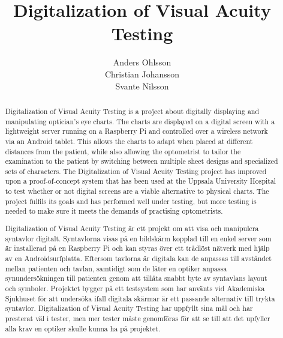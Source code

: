 \documentclass[12pt,a4paper,notitlepage]{report}
\begin{document}

\title{Digitalization of Visual Acuity Testing}
\author{Anders Ohlsson\\Christian Johansson\\Svante Nilsson}
\maketitle

\begin{abstract}
Digitalization of Visual Acuity Testing is a project about digitally displaying and manipulating optician's eye charts. The charts are displayed on a digital screen with a lightweight server running on a Raspberry Pi and controlled over a wireless network via an Android tablet. 
This allows the charts to adapt when placed at different distances from the patient, while also allowing the optometrist to tailor the examination to the patient by switching between multiple sheet designs and specialized sets of characters. 
The Digitalization of Visual Acuity Testing project has improved upon a proof-of-concept system that has been used at the Uppsala University Hospital to test whether or not digital screens are a viable alternative to physical charts. The project fulfils its goals and has performed well under testing, but more testing is needed to make sure it meets the demands of practising optometrists.
\end{abstract}
\renewcommand{\abstractname}{Sammanfattning}
\begin{abstract}
Digitalization of Visual Acuity Testing är ett projekt om att visa och manipulera syntavlor digitalt. Syntavlorna visas på en bildskärm kopplad till en enkel server som är installerad på en Raspberry Pi och kan styras över ett trådlöst nätverk med hjälp av en Androidsurfplatta. Eftersom tavlorna är digitala kan de anpassas till avståndet mellan patienten och tavlan, samtidigt som de låter en optiker anpassa synundersökningen till patienten genom att tillåta snabbt byte av syntavlans layout och symboler. Projektet bygger på ett testsystem som har använts vid Akademiska Sjukhuset för att undersöka ifall digitala skärmar är ett passande alternativ till trykta syntavlor. Digitalization of Visual Acuity Testing har uppfyllt sina mål och har presterat väl i tester, men mer tester måste genomföras för att se till att det upfyller alla krav en optiker skulle kunna ha på projektet.
\end{abstract}
\renewcommand\thechapter{ }
\tableofcontents*
\listoffigures
\clearpage
\end{document}
